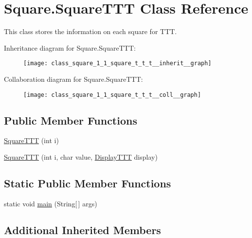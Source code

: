 \hypertarget{class_square_1_1_square_t_t_t}{}\section{Square.\+Square\+T\+T\+T Class Reference}
\label{class_square_1_1_square_t_t_t}


This class stores the information on each square for T\+T\+T.  




Inheritance diagram for Square.\+Square\+T\+T\+T\+:\nopagebreak
\begin{figure}[H]
\begin{center}
\leavevmode
\texttt{[image: class\_square\_1\_1\_square\_t\_t\_t\_\_inherit\_\_graph]}
\end{center}
\end{figure}


Collaboration diagram for Square.\+Square\+T\+T\+T\+:\nopagebreak
\begin{figure}[H]
\begin{center}
\leavevmode
\texttt{[image: class\_square\_1\_1\_square\_t\_t\_t\_\_coll\_\_graph]}
\end{center}
\end{figure}
\subsection*{Public Member Functions}
\begin{DoxyCompactItemize}
\item 
\hyperlink{class_square_1_1_square_t_t_t_a61856539b9717c3b5a3c6f46da3bb1a2}{Square\+T\+T\+T} (int i)
\item 
\hyperlink{class_square_1_1_square_t_t_t_aa369a31f4b3520bbbb7db02d31a11139}{Square\+T\+T\+T} (int i, char value, \hyperlink{class_display_1_1_display_t_t_t}{Display\+T\+T\+T} display)
\end{DoxyCompactItemize}
\subsection*{Static Public Member Functions}
\begin{DoxyCompactItemize}
\item 
static void \hyperlink{class_square_1_1_square_t_t_t_ad094b8dd8700576e4323fd69773dd6e9}{main} (String\mbox{[}$\,$\mbox{]} args)
\end{DoxyCompactItemize}
\subsection*{Additional Inherited Members}


